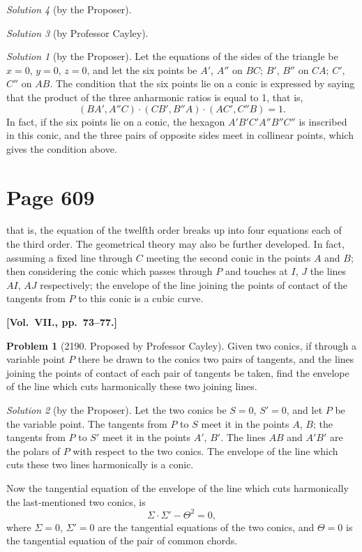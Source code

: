 \documentclass[12pt,a4paper]{article}
\theoremstyle{plain}
\theoremstyle{definition}
\newtheorem{problem}{Problem}
\theoremstyle{remark}
\newtheorem*{solution}{Solution}
\begin{document}
\begin{solution}[by the Proposer]
\begin{solution}[by Professor Cayley]
\begin{solution}[by the Proposer]
Let the equations of the sides of the triangle be $x = 0$, $y = 0$, $z = 0$, and let the six points be $A'$, $A''$ on $BC$; $B'$, $B''$ on $CA$; $C'$, $C''$ on $AB$. The condition that the six points lie on a conic is expressed by saying that the product of the three anharmonic ratios is equal to 1, that is,
\[
(BA', A''C) \cdot (CB', B''A) \cdot (AC', C''B) = 1.
\]
In fact, if the six points lie on a conic, the hexagon $A'B'C'A''B''C''$ is inscribed in this conic, and the three pairs of opposite sides meet in collinear points, which gives the condition above.
\end{solution}

\section*{Page 609}
\setcounter{page}{609}

that is, the equation of the twelfth order breaks up into four equations each of the third order. The geometrical theory may also be further developed. In fact, assuming a fixed line through $C$ meeting the second conic in the points $A$ and $B$; then considering the conic which passes through $P$ and touches at $I$, $J$ the lines $AI$, $AJ$ respectively; the envelope of the line joining the points of contact of the tangents from $P$ to this conic is a cubic curve.

\medskip\noindent\textbf{[Vol.~VII., pp.~73--77.]}

\begin{problem}[2190. Proposed by Professor Cayley]
Given two conics, if through a variable point $P$ there be drawn to the conics two pairs of tangents, and the lines joining the points of contact of each pair of tangents be taken, find the envelope of the line which cuts harmonically these two joining lines.
\end{problem}

\begin{solution}[by the Proposer]
Let the two conics be $S = 0$, $S' = 0$, and let $P$ be the variable point. The tangents from $P$ to $S$ meet it in the points $A$, $B$; the tangents from $P$ to $S'$ meet it in the points $A'$, $B'$. The lines $AB$ and $A'B'$ are the polars of $P$ with respect to the two conics. The envelope of the line which cuts these two lines harmonically is a conic.
\end{solution}

Now the tangential equation of the envelope of the line which cuts harmonically the last-mentioned two conics, is
\[
\Sigma \cdot \Sigma' - \Theta^2 = 0,
\]
where $\Sigma = 0$, $\Sigma' = 0$ are the tangential equations of the two conics, and $\Theta = 0$ is the tangential equation of the pair of common chords.


\end{solution}
\end{solution}
\end{document}
